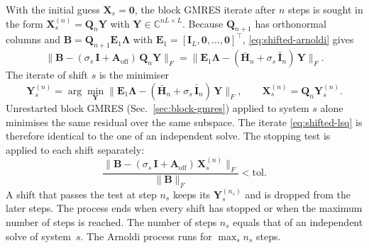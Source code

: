 \documentclass[11pt,a4paper]{article}
\begin{document}
With the initial guess $\mathbf{X}_s = \mathbf{0}$, the block GMRES
iterate after $n$ steps is sought in the form
$\mathbf{X}_s^{(n)} = \mathbf{Q}_n \mathbf{Y}$ with
$\mathbf{Y} \in \mathbb{C}^{nL \times L}$.
Because $\mathbf{Q}_{n+1}$ has orthonormal columns and
$\mathbf{B} = \mathbf{Q}_{n+1} \mathbf{E}_1 \boldsymbol{\Lambda}$ with
$\mathbf{E}_1 = [\mathbf{I}_L, \mathbf{0}, \ldots, \mathbf{0}]^\top$,
\eqref{eq:shifted-arnoldi} gives
\begin{equation}
  \bigl\| \mathbf{B}
      - (\sigma_s\,\mathbf{I} + \mathbf{A}_{\text{off}})\,
        \mathbf{Q}_n \mathbf{Y} \bigr\|_F
  = \bigl\| \mathbf{E}_1 \boldsymbol{\Lambda}
      - (\bar{\mathbf{H}}_n + \sigma_s\,\bar{\mathbf{I}}_n)\,
        \mathbf{Y} \bigr\|_F .
  \label{eq:shifted-residual}
\end{equation}
The iterate of shift $s$ is the minimiser
\begin{equation}
  \mathbf{Y}_s^{(n)}
    = \arg\min_{\mathbf{Y}}
      \bigl\| \mathbf{E}_1 \boldsymbol{\Lambda}
        - (\bar{\mathbf{H}}_n + \sigma_s\,\bar{\mathbf{I}}_n)\,
          \mathbf{Y} \bigr\|_F ,
  \qquad
  \mathbf{X}_s^{(n)} = \mathbf{Q}_n \mathbf{Y}_s^{(n)} .
  \label{eq:shifted-lsq}
\end{equation}
Unrestarted block GMRES (Sec.~\ref{sec:block-gmres}) applied to
system $s$ alone minimises the same residual over the same subspace.
The iterate \eqref{eq:shifted-lsq} is therefore identical to the one of
an independent solve.
The stopping test is applied to each shift separately:
\begin{equation}
  \frac{\bigl\| \mathbf{B}
      - (\sigma_s\,\mathbf{I} + \mathbf{A}_{\text{off}})\,
        \mathbf{X}_s^{(n)} \bigr\|_F}{\| \mathbf{B} \|_F}
  < \text{tol}.
  \label{eq:shifted-stop}
\end{equation}
A shift that passes the test at step $n_s$ keeps its
$\mathbf{Y}_s^{(n_s)}$ and is dropped from the later steps.
The process ends when every shift has stopped or when the maximum
number of steps is reached.
The number of steps $n_s$ equals that of an independent solve of
system~$s$.
The Arnoldi process runs for $\max_s n_s$ steps.
\end{document}
